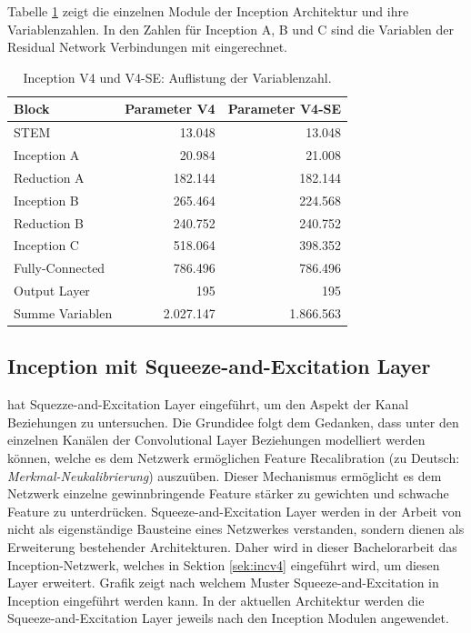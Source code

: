 Tabelle \ref{tb:var_inc4} zeigt die einzelnen Module der Inception Architektur und ihre Variablenzahlen. In den Zahlen f\"ur Inception A, B und C sind die Variablen der Residual Network Verbindungen mit eingerechnet. 

\begin{table}[ht]
\centering
\caption{Inception V4 und V4-SE: Auflistung der Variablenzahl.}
\begin{tabular}{@{}lrr@{}}
\hline
Block & Parameter V4 & Parameter V4-SE\\
\hline
STEM &  13.048 & 13.048\\
Inception A & 20.984 & 21.008\\
Reduction A & 182.144 & 182.144\\
Inception B & 265.464 & 224.568\\
Reduction B & 240.752 & 240.752\\
Inception C & 518.064 & 398.352\\
Fully-Connected & 786.496 & 786.496\\
Output Layer & 195 & 195\\
\hline
Summe Variablen & 2.027.147 & 1.866.563\\
\hline
\end{tabular}
\label{tb:var_inc4}
\end{table}

\subsection{Inception mit Squeeze-and-Excitation Layer}

\textcite{DBLP:journals/corr/abs-1709-01507} hat Squezze-and-Excitation Layer eingeführt, um den Aspekt der Kanal Beziehungen zu untersuchen. Die Grundidee folgt dem Gedanken, dass unter den einzelnen Kanälen der Convolutional Layer Beziehungen modelliert werden können, welche es dem Netzwerk ermöglichen Feature Recalibration (zu Deutsch: \textit{Merkmal-Neukalibrierung}) auszuüben. Dieser Mechanismus ermöglicht es dem Netzwerk einzelne gewinnbringende Feature stärker zu gewichten und schwache Feature zu unterdrücken. Squeeze-and-Excitation Layer werden in der Arbeit von \textcite{DBLP:journals/corr/abs-1709-01507} nicht als eigenständige Bausteine eines Netzwerkes verstanden, sondern dienen als Erweiterung bestehender Architekturen. Daher wird in dieser Bachelorarbeit das Inception-Netzwerk, welches in Sektion \ref{sek:incv4} eingeführt wird, um diesen Layer erweitert. Grafik zeigt nach welchem Muster Squeeze-and-Excitation in Inception eingeführt werden kann. In der aktuellen Architektur werden die Squeeze-and-Excitation Layer jeweils nach den Inception Modulen angewendet. 

